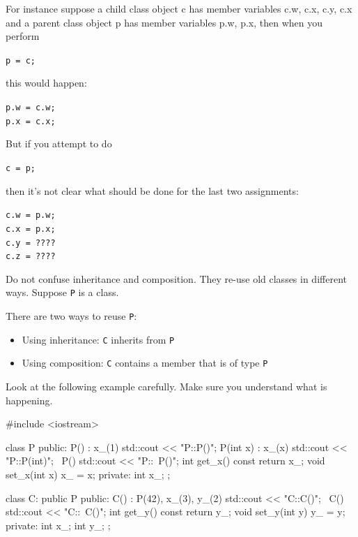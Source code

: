 For instance suppose a child class object c has member variables c.w,
c.x, c.y, c.x and a parent class object p has member variables p.w, p.x,
then when you perform
\begin{center}
\texttt{p = c;}
\end{center}
this would happen:
\begin{center}
\texttt{p.w = c.w;}\\
\texttt{p.x = c.x;}
\end{center}
But if you attempt to do
\begin{center}
\texttt{c = p;}
\end{center}
then it's not clear what should be done for the last two assignments:
\begin{center}
\texttt{c.w = p.w;}\\
\texttt{c.x = p.x;}\\
\texttt{c.y = ????}\\
\texttt{c.z = ????}
\end{center}

\newpage{}

Do not confuse inheritance and composition. They re-use old classes in
different ways. Suppose \verb!P! is a class.

There are two ways to reuse \verb!P!:

\begin{itemize}
\item
  Using inheritance: \verb!C! inherits from \verb!P!
\item
  Using composition: \verb!C! contains a member that is of type \verb!P!
\end{itemize}

Look at the following example carefully. Make sure you understand what
is happening.
\begin{console}
#include <iostream>

class P
{
public:
        P() : x_(1) { std::cout << "P::P()\n"; }
        P(int x) : x_(x) { std::cout << "P::P(int)\n"; }
        ~P() { std::cout << "P::~P()\n"; }
        int get_x() const { return x_; }
        void set_x(int x) { x_ = x; }
private:
        int x_;
};

class C: public P
{
public:
        C() : P(42), x_(3), y_(2)
        { std::cout << "C::C()"; }
        ~C() { std::cout << "C::~C()\n"; }
        int get_y() const { return y_; }
        void set_y(int y) { y_ = y; }
private:
        int x_;
        int y_;
};
\end{console}

